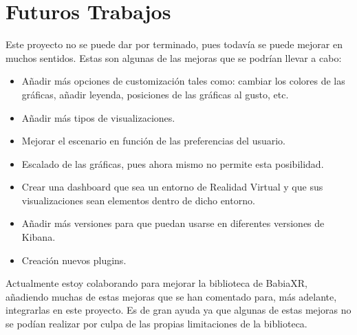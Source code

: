 \documentclass[a4paper, 12pt]{book}
\begin{document}
\section{Futuros Trabajos}
\label{sec:futuro}

 Este proyecto no se puede dar por terminado, pues todavía se puede mejorar en muchos sentidos. Estas son algunas de las mejoras que se podrían llevar a cabo:
 
 \begin{itemize}
     \item Añadir más opciones de customización tales como: cambiar los colores de las gráficas, añadir leyenda, posiciones de las gráficas al gusto, etc.
     \item Añadir más tipos de visualizaciones.
     \item Mejorar el escenario en función de las preferencias del usuario.
     \item Escalado de las gráficas, pues ahora mismo no permite esta posibilidad.
     \item Crear una dashboard que sea un entorno de Realidad Virtual y que sus visualizaciones sean elementos dentro de dicho entorno.
     \item Añadir más versiones para que puedan usarse en diferentes versiones de Kibana.
     \item Creación nuevos plugins.
 \end{itemize}
 
 Actualmente estoy colaborando para mejorar la biblioteca de BabiaXR, añadiendo muchas de estas mejoras que se han comentado para, más adelante, integrarlas en este proyecto. Es de gran ayuda ya que algunas de estas mejoras no se podían realizar por culpa de las propias limitaciones de la biblioteca.



%
\end{document}
